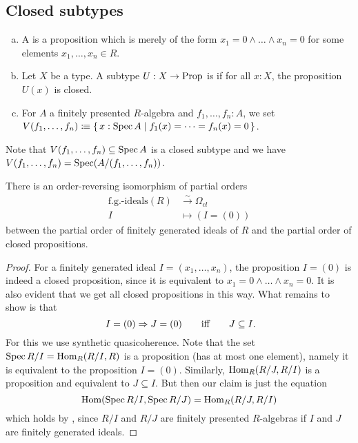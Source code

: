 
\subsection{Closed subtypes}

\begin{definition}%
  \label{closed-proposition}\label{closed-subtype}
  \begin{enumerate}[(a)]
  \item
    A  is a proposition
    which is merely of the form $x_1 = 0 \land \dots \land x_n = 0$
    for some elements $x_1, \dots, x_n \in R$.
  \item
    Let $X$ be a type.
    A subtype $U : X \to \mathrm{Prop}$ is 
    if for all $x : X$, the proposition $U(x)$ is closed.
  \item
    For $A$ a finitely presented $R$-algebra
    and $f_1, \dots, f_n : A$,
    we set
    $V(f_1, \dots, f_n) \vcentcolon\mspace{-1.2mu}\equiv
    \{\, x : \operatorname{Spec} A \mid f_1(x) = \dots = f_n(x) = 0 \,\}$.
  \end{enumerate}
\end{definition}

Note that $V(f_1, \dots, f_n) \subseteq \operatorname{Spec} A$ is a closed subtype
and we have $V(f_1, \dots, f_n) = \operatorname{Spec} (A/(f_1, \dots, f_n))$.

\begin{proposition}%
  There is an order-reversing isomorphism of partial orders
  \begin{align*}
    \text{f.g.-ideals}(R) &\xrightarrow{{\sim}} \Omega_{cl} \\
    I &\mapsto (I = (0))
  \end{align*}
  between the partial order of finitely generated ideals of $R$
  and the partial order of closed propositions.
\end{proposition}

\begin{proof}
  For a finitely generated ideal $I = (x_1, \dots, x_n)$,
  the proposition $I = (0)$ is indeed a closed proposition,
  since it is equivalent to $x_1 = 0 \land \dots \land x_n = 0$.
  It is also evident that we get all closed propositions in this way.
  What remains to show is that
  \[ I = (0) \Rightarrow J = (0)
     \qquad\text{iff}\qquad
     J \subseteq I
     \rlap{\text{.}}
  \]
  For this we use synthetic quasicoherence.
  Note that the set $\operatorname{Spec} R/I = \mathrm{Hom}_R(R/I, R)$ is a proposition
  (has at most one element),
  namely it is equivalent to the proposition $I = (0)$.
  Similarly, $\mathrm{Hom}_R(R/J, R/I)$ is a proposition
  and equivalent to $J \subseteq I$.
  But then our claim is just the equation
  \[ \mathrm{Hom}(\operatorname{Spec} R/I, \operatorname{Spec} R/J) = \mathrm{Hom}_R(R/J, R/I) \]
  which holds by ,
  since $R/I$ and $R/J$ are finitely presented $R$-algebras
  if $I$ and $J$ are finitely generated ideals.
\end{proof}

